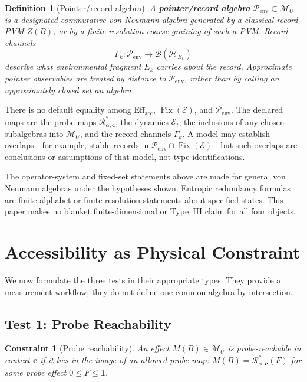 \documentclass[12pt,a4paper,openany]{book}
\newtheorem{definition}[theorem]{Definition}
\newtheorem{constraint}[theorem]{Constraint}
\begin{document}
\begin{definition}[Pointer/record algebra]
\label{H-E-def:pointer-algebra}
A \textbf{pointer/record algebra} $\mathcal P_{\mathrm{env}}\subset\mathcal M_U$ is a designated commutative von Neumann algebra generated by a classical record PVM $Z(B)$, or by a finite-resolution coarse graining of such a PVM.  Record channels
\[
\Gamma_k:\mathcal P_{\mathrm{env}}\longrightarrow\mathcal B(\mathcal H_{E_k})
\]
describe what environmental fragment $E_k$ carries about the record.  Approximate pointer observables are treated by distance to $\mathcal P_{\mathrm{env}}$, rather than by calling an approximately closed set an algebra.
\end{definition}

There is no default equality among $\mathrm{Eff}_{\mathrm{acc}}$, $\operatorname{Fix}(\mathcal E)$, and $\mathcal P_{\mathrm{env}}$.  The declared maps are the probe maps $\mathcal R_{\alpha,\mathbf c}^{*}$, the dynamics $\mathcal E_t$, the inclusions of any chosen subalgebras into $\mathcal M_U$, and the record channels $\Gamma_k$.  A model may establish overlaps---for example, stable records in $\mathcal P_{\mathrm{env}}\cap\operatorname{Fix}(\mathcal E)$---but such overlaps are conclusions or assumptions of that model, not type identifications.

The operator-system and fixed-set statements above are made for general von Neumann algebras under the hypotheses shown.  Entropic redundancy formulas are finite-alphabet or finite-resolution statements about specified states.  This paper makes no blanket finite-dimensional or Type~III claim for all four objects.

\section{Accessibility as Physical Constraint}
\label{H-E-sec:constraints}

We now formulate the three tests in their appropriate types.  They provide a measurement workflow; they do not define one common algebra by intersection.

\subsection{Test 1: Probe Reachability}

\begin{constraint}[Probe reachability]
\label{H-E-const:interaction}
An effect $M(B)\in\mathcal M_U$ is probe-reachable in context $\mathbf c$ if it lies in the image of an allowed probe map: $M(B)=\mathcal R_{\alpha,\mathbf c}^{*}(F)$ for some probe effect $0\le F\le\mathbf1$.
\end{constraint}
\end{document}
